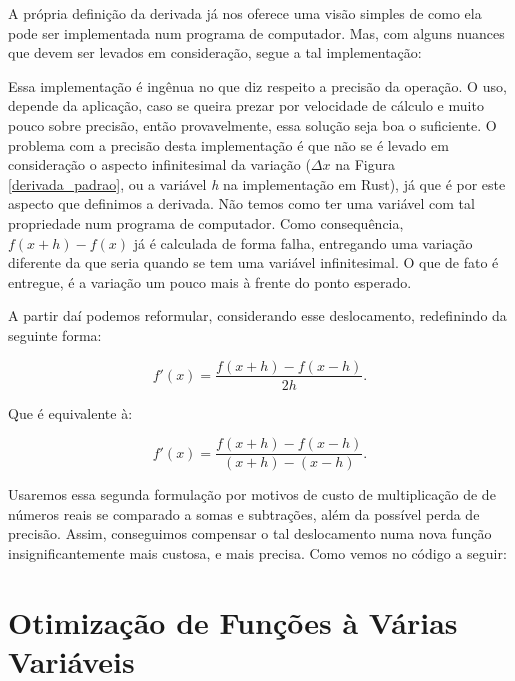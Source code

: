 \hspace{0.8cm}


A própria definição da derivada já nos oferece uma visão simples de como
ela pode ser implementada num programa de computador. Mas, com alguns nuances
que devem ser levados em consideração, segue a tal implementação:




Essa implementação é ingênua no que diz respeito a precisão da operação. O
uso, depende da aplicação, caso se queira prezar por velocidade de cálculo e
muito pouco sobre precisão, então provavelmente, essa solução seja boa o
suficiente. O problema com a precisão desta implementação é que não se é
levado em consideração o aspecto infinitesimal da variação (\(\Delta x\) na
Figura \ref{derivada_padrao}, ou a variável \textit{h} na implementação
em Rust), já que é por este aspecto que definimos a derivada. Não temos como ter
uma variável com tal propriedade num programa de computador. Como consequência,
\(f(x + h) - f(x)\) já é calculada de forma falha, entregando uma variação
diferente da que seria quando se tem uma variável infinitesimal. O que de fato
é entregue, é a variação um pouco mais à frente do ponto esperado.

A partir daí podemos reformular, considerando esse deslocamento, redefinindo
da seguinte forma:


\begin{equation}
    f'(x) = \frac{f(x + h) - f(x - h)}{2h}.
\end{equation}

Que é equivalente à:

\begin{equation}
    f'(x) = \frac{f(x + h) - f(x - h)}{(x + h) - (x - h)}.
\end{equation}


Usaremos essa segunda formulação por motivos de custo de multiplicação de de
números reais se comparado a somas e subtrações, além da possível perda de
precisão. Assim, conseguimos compensar o tal deslocamento numa nova função
insignificantemente mais custosa, e mais precisa. Como vemos no código a seguir:




\section{{Otimização de Funções à Várias Variáveis}}

